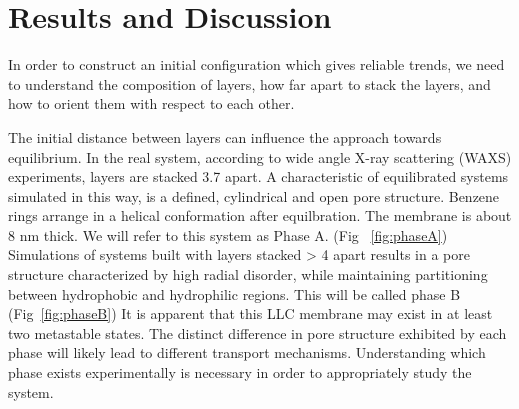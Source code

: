 \section{Results and Discussion}

In order to construct an initial configuration which gives reliable 
trends, we need to understand the composition of layers, how far apart
to stack the layers, and how to orient them with respect to each other.

The initial distance between layers can influence the approach towards
equilibrium. In the real system, according to wide angle X-ray
scattering (WAXS) experiments, layers are stacked 3.7 \angstrom apart.
A characteristic of equilibrated systems simulated in this way, is a
defined, cylindrical and open pore structure. Benzene rings arrange in
a helical conformation after equilbration. The membrane is about 8 nm
thick. We will refer to this system as Phase A. (Fig ~\ref{fig:phaseA})
Simulations of systems built with layers stacked > 4 \angstrom apart
results in a pore structure characterized by high radial disorder,
while maintaining partitioning between hydrophobic and hydrophilic
regions. This will be called phase B (Fig~\ref{fig:phaseB})
It is apparent that this LLC membrane may exist in at least two
metastable states. The distinct difference in pore structure exhibited
by each phase will likely lead to different transport mechanisms.
Understanding which phase exists experimentally is necessary in order
to appropriately study the system.

